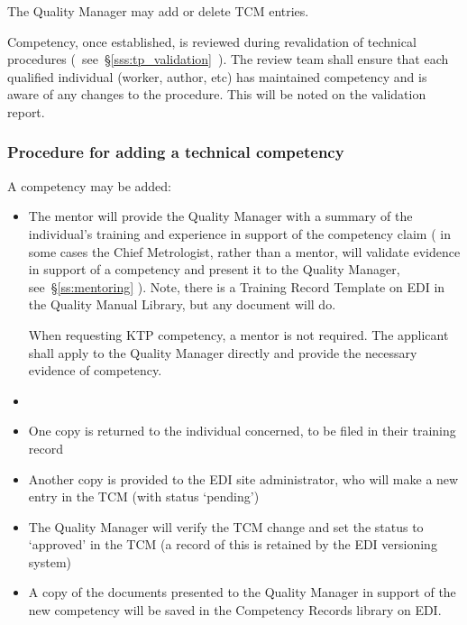The Quality Manager may add or delete TCM entries. 

Competency, once established, is reviewed during revalidation of technical procedures (~see~\S\ref{sss:tp_validation}~).  The review team shall ensure that each qualified individual (worker, author, etc) has maintained competency and is aware of any changes to the procedure. This will be noted on the validation report. 

\subsubsection{Procedure for adding a technical competency}
\label{sss:tcm_procedure}
A competency may be added:
\begin{itemize}
\item The mentor will provide the Quality Manager with a summary of the individual's training and experience in support of the competency claim ( in some cases the Chief Metrologist, rather than a mentor, will validate evidence in support of a competency and present it to the Quality Manager, see~\S\ref{ss:mentoring} ). Note, there is a Training Record Template on EDI in the Quality Manual Library, but any document will do.

When requesting KTP competency, a mentor is not required. The applicant shall apply to the Quality Manager directly and provide the necessary evidence of competency.

\item {} 

\item One copy is returned to the individual concerned, to be filed in their training record

\item Another copy is provided to the EDI site administrator, who will make a new entry in the TCM (with status ‘pending') 

\item The Quality Manager will verify the TCM change and set the status to ‘approved' in the TCM (a record of this is retained by the EDI versioning system)

\item A copy of the documents presented to the Quality Manager in support of the new competency will be saved in the Competency Records library on EDI.
\end{itemize}

